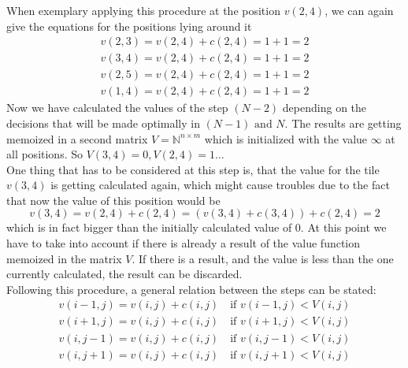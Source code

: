 \documentclass[conference]{IEEEtran}
\begin{document}
When exemplary applying this procedure at the position $v(2,4)$, we can again give the equations for the positions lying around it
\begin{align}
v(2,3) = v(2,4) + c(2,4) = 1 + 1 = 2\\
v(3,4) = v(2,4) + c(2,4) = 1 + 1 = 2\\
v(2,5) = v(2,4) + c(2,4) = 1 + 1 = 2\\
v(1,4) = v(2,4) + c(2,4) = 1 + 1 = 2
\end{align}
Now we have calculated the values of the step $(N-2)$ depending on the decisions that will be made optimally in $(N-1) \text{ and } N$. The results are getting memoized in a second matrix $V = \mathbb{N}^{n \times m}$ which is initialized with the value $\infty$ at all positions. So $V(3,4) = 0, V(2,4)=1 \dots$\\ 
One thing that has to be considered at this step is, that the value for the tile $v(3,4)$ is getting calculated again, which might cause troubles due to the fact that now the value of this position would be
\begin{equation}
v(3,4) = v(2,4) + c(2,4) = (v(3,4) + c(3,4)) + c(2,4) = 2
\end{equation}
which is in fact bigger than the initially calculated value of $0$. At this point we have to take into account if there is already a result of the value function memoized in the matrix $V$. If there is a result, and the value is less than the one currently calculated, the result can be discarded.\\
Following this procedure, a general relation between the steps can be stated:
\begin{align}
v(i-1,j) = v(i,j) + c(i,j) \quad \text{if } v(i-1,j) < V(i,j)\\
v(i+1,j) = v(i,j) + c(i,j) \quad \text{if } v(i+1,j) < V(i,j)\\
v(i,j-1) = v(i,j) + c(i,j) \quad \text{if } v(i,j-1) < V(i,j)\\
v(i,j+1) = v(i,j) + c(i,j) \quad \text{if } v(i,j+1) < V(i,j)
\end{align}
\end{document}
